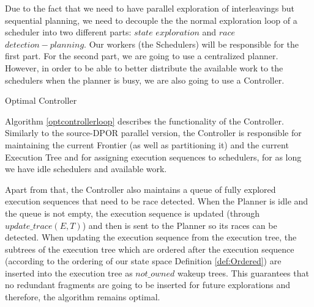 Due to the fact that we need to have parallel exploration of interleavings but sequential planning, we need to decouple the
the normal exploration loop of a scheduler into two different parts: $state$ $exploration$ and $race$ $detection-planning$.
Our workers (the Schedulers) will be responsible for the first part. For the second part, we are going to use a centralized
planner. However, in order to be able to better distribute the available work to the schedulers when the planner is busy,
we are also going to use a Controller.

\begin{algorithm}
    \caption{Optimal Controller}
    \label{optcontrollerloop}

\end{algorithm}

Algorithm \ref{optcontrollerloop} describes the functionality of the Controller. Similarly to the source-DPOR parallel version,
the Controller is responsible for maintaining the current Frontier (as well as partitioning it) and the current Execution Tree
and for assigning execution sequences to schedulers, for as long we have idle schedulers and available work.

Apart from that, the Controller also maintains a queue of fully explored execution sequences that need to be race detected.
When the Planner is idle and the queue is not empty, the execution sequence is updated (through $update\_trace(E,T)$)
and then is sent to the Planner so its races can be detected. When updating the execution sequence from the execution tree,
the subtrees of the execution tree which are ordered after the execution sequence (according to the ordering of our state
space Definition \ref{def:Ordered}) are inserted into the execution tree as $not\_owned$ wakeup trees. This guarantees
that no redundant fragments are going to be inserted for future explorations and therefore, the algorithm remains optimal. 


